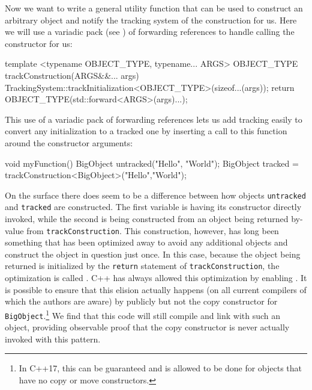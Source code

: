 \noindent Now we want to write a general utility function that can be used to
construct an arbitrary object and notify the tracking system of the
construction for us. Here we will use a variadic pack (see )
of forwarding references to handle
calling the constructor for us:

\begin{emcppslisting}[emcppsbatch=e10]
template <typename OBJECT_TYPE, typename... ARGS>
OBJECT_TYPE trackConstruction(ARGS&&... args)
{
    TrackingSystem::trackInitialization<OBJECT_TYPE>(sizeof...(args));
    return OBJECT_TYPE(std::forward<ARGS>(args)...);
}
\end{emcppslisting}

\noindent This use of a variadic pack of forwarding references lets us add tracking easily to convert any initialization to a
tracked one by inserting a call to this function around the constructor
arguments:

\begin{emcppslisting}[emcppsbatch=e10]
void myFunction()
{
    BigObject untracked("Hello", "World");
    BigObject tracked = trackConstruction<BigObject>("Hello","World");
}
\end{emcppslisting}

\noindent On the surface there does seem to be a difference between how
objects \lstinline!untracked! and \lstinline!tracked! are constructed. The first
variable is having its constructor directly invoked, while the second is
being constructed from an object being returned by-value from
\lstinline!trackConstruction!. This construction, however, has long been
something that has been optimized away to avoid any additional objects
and construct the object in question just once. In this case, because
the object being returned is initialized by the \lstinline!return!
statement of \lstinline!trackConstruction!, the optimization is called
. C++ has always
allowed this optimization by enabling . It is possible to ensure that this elision actually happens (on all current compilers of which the authors are aware) by publicly  but not  the copy
constructor for \lstinline!BigObject!.\footnote{In C++17,
this  can be guaranteed and is allowed to be done for
objects that have no copy or move constructors.} We find that this code will
still compile and link with such an object, providing observable proof
that the copy constructor is never actually invoked with this pattern.

